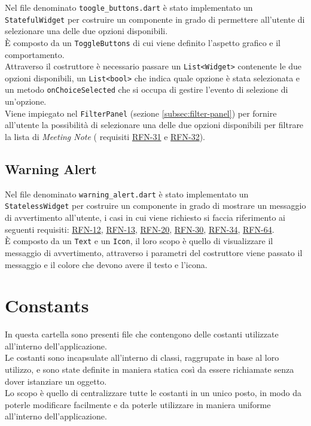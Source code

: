 Nel file denominato \lstinline{toogle_buttons.dart} è stato implementato un \lstinline{StatefulWidget} per costruire un componente in grado di permettere all'utente di selezionare una delle due opzioni disponibili.\\
È composto da un \lstinline{ToggleButtons}\cite{site:toggle-buttons} di cui viene definito l'aspetto grafico e il comportamento.\\
Attraverso il costruttore è necessario passare un \lstinline{List<Widget>} contenente le due opzioni disponibili, un \lstinline{List<bool>} che indica quale opzione è stata selezionata e un metodo \lstinline{onChoiceSelected} che si occupa di gestire l'evento di selezione di un'opzione.\\
Viene impiegato nel \lstinline{FilterPanel} (sezione \ref{subsec:filter-panel}) per fornire all'utente la possibilità di selezionare una delle due opzioni disponibili per filtrare la lista di \emph{Meeting Note} ( requisiti \hyperref[RFN-31]{RFN-31} e \hyperref[RFN-32]{RFN-32}).

\subsection{Warning Alert}
\label{subsec:warning-alert}

Nel file denominato \lstinline{warning_alert.dart} è stato implementato un \lstinline{StatelessWidget} per costruire un componente in grado di mostrare un messaggio di avvertimento all'utente, i casi in cui viene richiesto si faccia riferimento ai seguenti requisiti: \hyperref[RFN-12]{RFN-12}, \hyperref[RFN-13]{RFN-13}, \hyperref[RFN-20]{RFN-20}, \hyperref[RFN-30]{RFN-30}, \hyperref[RFN-34]{RFN-34}, \hyperref[RFN-64]{RFN-64}. \\
È composto da un \lstinline{Text}\cite{site:text} e un \lstinline{Icon}\cite{site:icon}, il loro scopo è quello di visualizzare il messaggio di avvertimento, attraverso i parametri del costruttore viene passato il messaggio e il colore che devono avere il testo e l'icona. 

\section{Constants}
\label{sec:constants}

In questa cartella sono presenti file che contengono delle costanti utilizzate all'interno dell'applicazione.\\
Le costanti sono incapsulate all'interno di classi, raggrupate in base al loro utilizzo, e sono state definite in maniera statica così da essere richiamate senza dover istanziare un oggetto.\\
Lo scopo è quello di centralizzare tutte le costanti in un unico posto, in modo da poterle modificare facilmente e da poterle utilizzare in maniera uniforme all'interno dell'applicazione.


